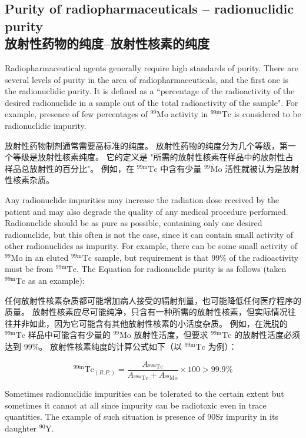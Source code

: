 \documentclass[dvipsnames, svgnames,a4paper,11pt]{article}
\begin{document}
\subsection{Purity of radiopharmaceuticals – radionuclidic purity \\放射性药物的纯度--放射性核素的纯度}

Radiopharmaceutical agents generally require high standards of purity. There are
several levels of purity in the area of radiopharmaceuticals, and the first one is the
radionuclidic purity. It is defined as a “percentage of the radioactivity of the desired
radionuclide in a sample out of the total radioactivity of the sample". For example,
presence of few percentages of ${}^{99}\mathrm{Mo}$ activity in ${}^\mathrm{99m}\mathrm{Tc}$ is considered to be
radionuclidic impurity.

放射性药物制剂通常需要高标准的纯度。 放射性药物的纯度分为几个等级，第一个等级是放射性核素纯度。 它的定义是 "所需的放射性核素在样品中的放射性占样品总放射性的百分比"。 例如，在 ${}^\mathrm{99m}\mathrm{Tc}$ 中含有少量 ${}^{99}\mathrm{Mo}$ 活性就被认为是放射性核素杂质。

Any radionuclide impurities may increase the radiation dose received by the patient
and may also degrade the quality of any medical procedure performed. Radionuclide
should be as pure as possible, containing only one desired radionuclide, but this
often is not the case, since it can contain small activity of other radionuclides as
impurity. For example, there can be some small activity of ${}^{99}\mathrm{Mo}$ in an eluted ${}^\mathrm{99m}\mathrm{Tc}$
sample, but requirement is that 99\% of the radioactivity must be from ${}^\mathrm{99m}\mathrm{Tc}$. The
Equation for radionuclide purity is as follows (taken ${}^\mathrm{99m}\mathrm{Tc}$ as an example):

任何放射性核素杂质都可能增加病人接受的辐射剂量，也可能降低任何医疗程序的质量。 放射性核素应尽可能纯净，只含有一种所需的放射性核素，但实际情况往往并非如此，因为它可能含有其他放射性核素的小活度杂质。 例如，在洗脱的 ${}^\mathrm{99m}\mathrm{Tc}$ 样品中可能含有少量的 ${}^{99}\mathrm{Mo}$ 放射性活度，但要求 ${}^\mathrm{99m}\mathrm{Tc}$ 的放射性活度必须达到 99\%。 放射性核素纯度的计算公式如下（以 ${}^\mathrm{99m}\mathrm{Tc}$ 为例）：

$${ }^{99 \mathrm{m} } \mathrm{Tc} _{(R . P .)}=\frac{A_{{ }^{99 \mathrm{m} } \mathrm{Tc}}}{A_{{ }^{99 \mathrm{m} } \mathrm{Tc}}+A_{{ }^{99} \mathrm{Mo}}} \times 100>99.9 \%$$

Sometimes radionuclidic impurities can be tolerated to the certain extent but
sometimes it cannot at all since impurity can be radiotoxic even in trace quantities.
The example of such situation is presence of 90Sr impurity in its daughter \(\mathrm{{}^{90}Y}\).
\end{document}

